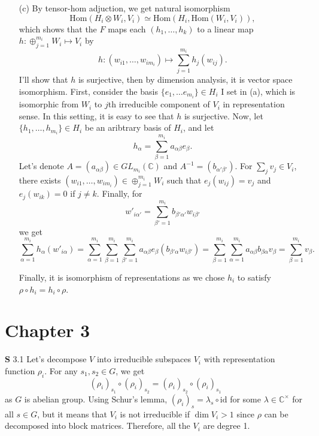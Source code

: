 \documentclass[a4paper, 12pt]{article}
\theoremstyle{Mydefinition}
\theoremstyle{Mytheorem}
\begin{document}
\begin{enumerate}
    \item[(c)] By tensor-hom adjuction, we get natural isomorphism
    \begin{equation}
        \mathrm{Hom}(H_i\otimes W_i, V_i)\simeq \mathrm{Hom}(H_i, \mathrm{Hom}(W_i, V_i)),
    \end{equation}
    which shows that the $F$ maps each $(h_1, \ldots, h_k)$ to a linear map $h:\oplus_{j=1}^{m_i}W_i\mapsto V_i$ by
    \begin{equation}
        h:(w_{i1}, \ldots, w_{im_i})\mapsto \sum_{j=1}^{m_i}h_j(w_{ij}).
    \end{equation}
    I'll show that $h$ is surjective, then by dimension analysis, it is vector space isomorphism. First, consider the basis $\{e_1, \ldots e_{m_i}\}\in H_i$ I set in (a), which is isomorphic from $W_i$ to $j$th irreducible component of $V_i$ in representation sense. In this setting, it is easy to see that $h$ is surjective. Now, let $\{h_1, \ldots, h_{m_i}\}\in H_i$ be an aribtrary basis of $H_i$, and let
    \begin{equation}
        h_\alpha = \sum_{\beta=1}^{m_i}a_{\alpha \beta}e_{\beta}.
    \end{equation}
    Let's denote $A = (a_{\alpha\beta})\in GL_{m_i}(\mathbb{C})$ and $A^{-1} = (b_{\alpha'\beta'})$. For $\sum_{j}v_{j}\in V_i$, there exists $(w_{i1}, \ldots, w_{im_i})\in \oplus_{j=1}^{m_i} W_i$ such that $e_j(w_{ij}) = v_j$ and $e_j(w_{ik})=0$ if $j\neq k$. Finally, for
    \begin{equation}
        w'_{i\alpha'} = \sum_{\beta'=1}^{m_i}b_{\beta'\alpha'}w_{i\beta'}
    \end{equation}
    we get
    \begin{equation}
        \sum_{\alpha=1}^{m_i} h_\alpha(w'_{i\alpha}) =\sum_{\alpha=1}^{m_i} \sum_{\beta=1}^{m_i}\sum_{\beta'=1}^{m_i}a_{\alpha \beta}e_\beta(b_{\beta'\alpha}w_{i\beta'}) = \sum_{\beta=1}^{m_i}\sum_{\alpha=1}^{m_i} a_{\alpha \beta}b_{\beta\alpha}v_{\beta} = \sum_{\beta=1}^{m_i} v_\beta.
    \end{equation}
    
    Finally, it is isomorphism of representations as we chose $h_i$ to satisfy $\rho\circ h_i = h_i\circ \rho$.
\end{enumerate}

\section{Chapter 3}

\noindent \textbf{S} 3.1
Let's decompose $V$ into irreducible subspaces $V_i$ with representation function $\rho_i$. For any $s_1,s_2\in G$, we get
\begin{equation}
    \left(\rho_i\right)_{s_1}\circ \left(\rho_i\right)_{s_2} = \left(\rho_i\right)_{s_2}\circ \left(\rho_i\right)_{s_1}
\end{equation}
as $G$ is abelian group. Using Schur's lemma, $\left(\rho_i\right)_{s} = \lambda_s\circ \mathrm{id}$ for some $\lambda\in \mathbb{C}^\times$ for all $s\in G$, but it means that $V_i$ is not irreducible if $\dim V_i>1$ since $\rho$ can be decomposed into block matrices. Therefore, all the $V_i$ are degree 1.\\
\end{document}
